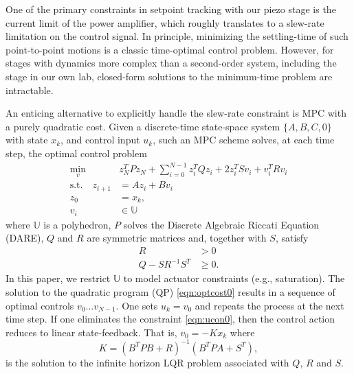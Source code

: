 \documentclass[twocolumn,twoside]{IEEEtran}
\begin{document}
One of the primary constraints in setpoint tracking with our piezo stage is the current limit of the power amplifier,  which roughly translates to a slew-rate limitation on the control signal.
In principle, minimizing the settling-time of such point-to-point motions is a classic time-optimal control problem. %
However, for stages with dynamics more complex than a second-order system,  including the stage in our own lab, closed-form solutions to the minimum-time problem are intractable. 

An enticing alternative to explicitly handle the slew-rate constraint is MPC with a purely quadratic cost. 
Given a discrete-time state-space system $\{A,B,C,0\}$ with state $x_k$, and control input $u_k$, such an MPC scheme solves, at each time step, the optimal control problem 
\begin{subequations}
\begin{align}
\min_{v}\:\:& z^T_{N}Pz_{N} + \sum_{i=0}^{N-1}z_{i}^{T}Qz_{i} + 2z^T_iSv_i + v^{T}_{i}Rv_{i} \\
 \text{s.t.} \quad z_{i+1} &= A z_{i} + B v_{i}\\
z_{0} &= x_{k}, \\
v_i  &\in \mathds{U} \label{eqn:ucon0}
\end{align}\label{eqn:optcost0}%
\end{subequations}
where $\mathds{U}$ is a polyhedron, $P$ solves the Discrete Algebraic Riccati Equation (DARE), $Q$ and $R$ are symmetric matrices and, together with $S$, satisfy
\begin{align}
  R &> 0 \label{eqn:schur0}\\
  Q - SR^{-1}S^T &\geq 0. \label{eqn:schur1}
\end{align}
In this paper, we restrict $\mathds{U}$ to model actuator constraints (e.g., saturation). The solution to the quadratic program (QP) \eqref{eqn:optcost0} results in a sequence of optimal controls $v_0\dots v_{N-1}$. One sets $u_k = v_0$ and repeats the process at the next time step. If one eliminates the constraint \eqref{eqn:ucon0}, then the control action reduces to linear state-feedback. That is, $v_0=-Kx_k$ where
\begin{equation}
  K = (B^TPB + R)^{-1}(B^TPA + S^T),\label{eqn:klin0}
\end{equation}
is the solution to the infinite horizon LQR problem associated with $Q$, $R$ and $S$. 
\end{document}
